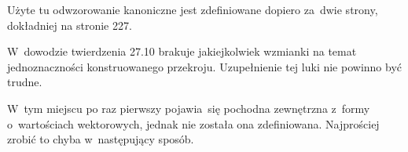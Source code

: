 \documentclass[a4paper,11pt]{article}
\begin{document}
\vspace{\spaceFour}


\start {} Użyte tu odwzorowanie kanoniczne jest zdefiniowane
dopiero za~dwie strony, dokładniej na stronie 227.

\vspace{\spaceFour}


\start {} W~dowodzie twierdzenia 27.10 brakuje jakiejkolwiek
wzmianki na temat jednoznaczności konstruowanego przekroju.
Uzupełnienie tej luki nie powinno być trudne.

\vspace{\spaceFour}


\start {} W~tym miejscu po raz pierwszy pojawia~się pochodna
zewnętrzna z~formy o~wartościach wektorowych, jednak nie została ona
zdefiniowana. Najprościej zrobić to chyba w~następujący sposób.
\end{document}
